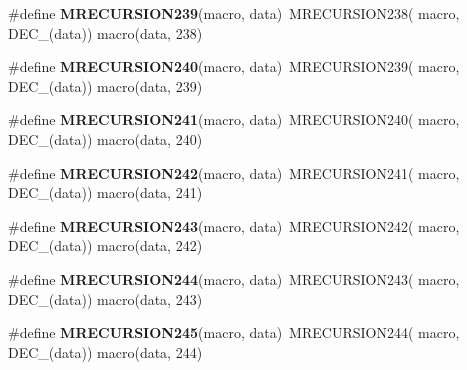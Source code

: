 \begin{DoxyCompactItemize}
\item 
\hypertarget{group__group__sam0__utils__mrecursion_ga6ab69c1fbf584a9c78f9ab0929850a32}{}\#define {\bfseries M\+R\+E\+C\+U\+R\+S\+I\+O\+N239}(macro,  data)~M\+R\+E\+C\+U\+R\+S\+I\+O\+N238(  macro, D\+E\+C\+\_\+(data))   macro(data, 238)\label{group__group__sam0__utils__mrecursion_ga6ab69c1fbf584a9c78f9ab0929850a32}

\item 
\hypertarget{group__group__sam0__utils__mrecursion_ga9923ea8aad0a2c13e0685441357f2e96}{}\#define {\bfseries M\+R\+E\+C\+U\+R\+S\+I\+O\+N240}(macro,  data)~M\+R\+E\+C\+U\+R\+S\+I\+O\+N239(  macro, D\+E\+C\+\_\+(data))   macro(data, 239)\label{group__group__sam0__utils__mrecursion_ga9923ea8aad0a2c13e0685441357f2e96}

\item 
\hypertarget{group__group__sam0__utils__mrecursion_ga0a5cf75038514f2ec97ba39d8bee8e7a}{}\#define {\bfseries M\+R\+E\+C\+U\+R\+S\+I\+O\+N241}(macro,  data)~M\+R\+E\+C\+U\+R\+S\+I\+O\+N240(  macro, D\+E\+C\+\_\+(data))   macro(data, 240)\label{group__group__sam0__utils__mrecursion_ga0a5cf75038514f2ec97ba39d8bee8e7a}

\item 
\hypertarget{group__group__sam0__utils__mrecursion_gac9925d3d1732bd7e47e61f7c9dfeafbd}{}\#define {\bfseries M\+R\+E\+C\+U\+R\+S\+I\+O\+N242}(macro,  data)~M\+R\+E\+C\+U\+R\+S\+I\+O\+N241(  macro, D\+E\+C\+\_\+(data))   macro(data, 241)\label{group__group__sam0__utils__mrecursion_gac9925d3d1732bd7e47e61f7c9dfeafbd}

\item 
\hypertarget{group__group__sam0__utils__mrecursion_gaa82beeebaab247b9ed2ac646cfe20f9c}{}\#define {\bfseries M\+R\+E\+C\+U\+R\+S\+I\+O\+N243}(macro,  data)~M\+R\+E\+C\+U\+R\+S\+I\+O\+N242(  macro, D\+E\+C\+\_\+(data))   macro(data, 242)\label{group__group__sam0__utils__mrecursion_gaa82beeebaab247b9ed2ac646cfe20f9c}

\item 
\hypertarget{group__group__sam0__utils__mrecursion_gac3825130b40518fcd95815a474335cfa}{}\#define {\bfseries M\+R\+E\+C\+U\+R\+S\+I\+O\+N244}(macro,  data)~M\+R\+E\+C\+U\+R\+S\+I\+O\+N243(  macro, D\+E\+C\+\_\+(data))   macro(data, 243)\label{group__group__sam0__utils__mrecursion_gac3825130b40518fcd95815a474335cfa}

\item 
\hypertarget{group__group__sam0__utils__mrecursion_ga29389831061b5516c92aecda3fa98385}{}\#define {\bfseries M\+R\+E\+C\+U\+R\+S\+I\+O\+N245}(macro,  data)~M\+R\+E\+C\+U\+R\+S\+I\+O\+N244(  macro, D\+E\+C\+\_\+(data))   macro(data, 244)\label{group__group__sam0__utils__mrecursion_ga29389831061b5516c92aecda3fa98385}


\end{DoxyCompactItemize}
